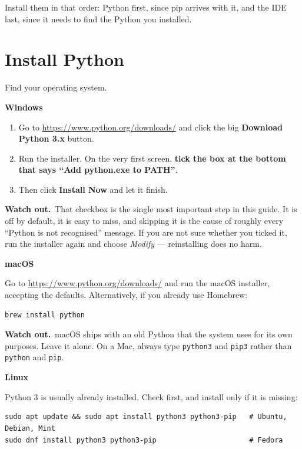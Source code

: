\documentclass[11pt]{article}
\newcommand{\plat}[1]{\smallskip\noindent
  \textcolor{BrickRed}{\sffamily\bfseries #1}\par\nopagebreak\smallskip}
\newcommand{\heads}[1]{\par\smallskip\noindent
  {\small\sffamily\textcolor{BrickRed}{\textbf{Watch out.}}\ #1}\par\smallskip}
\begin{document}
\noindent Install them in that order: Python first, since pip arrives with it,
and the IDE last, since it needs to find the Python you installed.

\section{Install Python}
Find your operating system.

\plat{Windows}
\begin{enumerate}[leftmargin=2.0em,itemsep=4pt]
  \item Go to \url{https://www.python.org/downloads/} and click the big
        \textbf{Download Python 3.x} button.
  \item Run the installer. On the very first screen, \textbf{tick the box at the
        bottom that says ``Add python.exe to PATH''}.
  \item Then click \textbf{Install Now} and let it finish.
\end{enumerate}

\heads{That checkbox is the single most important step in this guide. It is off
by default, it is easy to miss, and skipping it is the cause of roughly every
``Python is not recognised'' message. If you are not sure whether you ticked it,
run the installer again and choose \emph{Modify} --- reinstalling does no
harm.}

\plat{macOS}
Go to \url{https://www.python.org/downloads/} and run the macOS installer,
accepting the defaults. Alternatively, if you already use Homebrew:

\begin{lstlisting}
brew install python
\end{lstlisting}

\heads{macOS ships with an old Python that the system uses for its own purposes.
Leave it alone. On a Mac, always type \texttt{python3} and \texttt{pip3} rather
than \texttt{python} and \texttt{pip}.}

\plat{Linux}
Python 3 is usually already installed. Check first, and install only if it is
missing:

\begin{lstlisting}
sudo apt update && sudo apt install python3 python3-pip   # Ubuntu, Debian, Mint
sudo dnf install python3 python3-pip                      # Fedora
\end{lstlisting}
\end{document}
